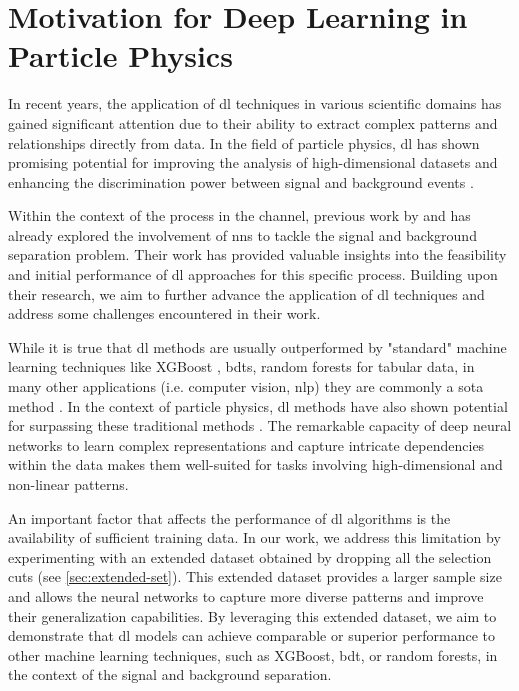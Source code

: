\section{Motivation for Deep Learning in Particle Physics}

In recent years, the application of \gls{dl} techniques in various scientific domains has gained significant
attention due to their ability to extract complex patterns and relationships directly from data. In the field of
particle physics, \gls{dl} has shown promising potential for improving the analysis of high-dimensional datasets
and enhancing the discrimination power between signal and background events \cite{dl-in-pp}.

Within the context of the \tth process in the \lss channel, previous work by \cite{severin} and \cite{jan} has already
explored the involvement of \glspl{nn} to tackle the signal and background separation problem. Their work has
provided valuable insights into the feasibility and initial performance of \gls{dl} approaches for this specific
process. Building upon their research, we aim to further advance the application of \gls{dl} techniques and address
some challenges encountered in their work.

While it is true that \gls{dl} methods are usually outperformed \cite{tabular} by "standard" machine learning techniques
like XGBoost \cite{xgboost}, \glspl{bdt}, random forests \cite{random-forrest} for tabular data, in many other
applications (i.e. computer vision, \gls{nlp}) they are commonly a \gls{sota} method
\cite{gpt4-technical,gpt4-sparks,diffusion}. %
In the context of particle physics, \gls{dl} methods have also shown potential for surpassing these traditional methods
\cite{jet-rnn}.  The remarkable capacity of deep neural networks to learn complex representations and capture intricate
dependencies within the data makes them well-suited for tasks involving high-dimensional and non-linear patterns.

An important factor that affects the performance of \gls{dl} algorithms is the availability of sufficient training data.
In our work, we address this limitation by experimenting with an extended dataset obtained by dropping all the
selection cuts (see \autoref{sec:extended-set}). This extended dataset provides a larger sample size and allows the
neural networks to capture more diverse patterns and improve their generalization capabilities. By leveraging this
extended dataset, we aim to demonstrate that \gls{dl} models can achieve comparable or superior performance to other
machine learning techniques, such as XGBoost, \gls{bdt}, or random forests, in the context of the \tth signal and
background separation.

